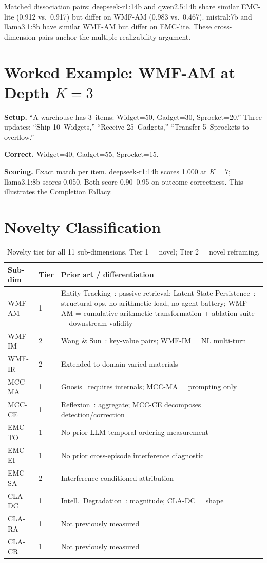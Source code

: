 \documentclass{article}
\begin{document}
Matched dissociation pairs: deepseek-r1:14b and qwen2.5:14b share
similar EMC-lite (0.912 vs.\ 0.917) but differ on WMF-AM (0.983 vs.\
0.467). mistral:7b and llama3.1:8b have similar WMF-AM but differ on
EMC-lite. These cross-dimension pairs anchor the multiple realizability
argument.

\section{Worked Example: WMF-AM at Depth $K{=}3$}
\label{app:worked}

\noindent\textbf{Setup.} ``A warehouse has 3~items: Widget=50,
Gadget=30, Sprocket=20.'' Three updates: ``Ship 10~Widgets,''
``Receive 25~Gadgets,'' ``Transfer 5~Sprockets to overflow.''

\noindent\textbf{Correct.} Widget=40, Gadget=55, Sprocket=15.

\noindent\textbf{Scoring.} Exact match per item. deepseek-r1:14b scores
1.000 at $K{=}7$; llama3.1:8b scores 0.050. Both score 0.90--0.95 on
outcome correctness. This illustrates the Completion Fallacy.

\section{Novelty Classification}
\label{app:novelty}

\begin{table}[h]
\centering
\small
\caption{Novelty tier for all 11 sub-dimensions. Tier 1 = novel;
Tier 2 = novel reframing.}
\label{tab:novelty}
\begin{tabular}{llp{6.5cm}}
\toprule
\textbf{Sub-dim} & \textbf{Tier} & \textbf{Prior art / differentiation} \\
\midrule
WMF-AM & 1 & Entity Tracking~\citep{entitytracking2023}: passive retrieval; Latent State Persistence~\citep{huang2025language}: structural ops, no arithmetic load, no agent battery; WMF-AM = cumulative arithmetic transformation + ablation suite + downstream validity \\
WMF-IM & 2 & Wang \& Sun~\citep{wang2025unableforgetproactiveinterference}: key-value pairs; WMF-IM = NL multi-turn \\
WMF-IR & 2 & Extended to domain-varied materials \\
MCC-MA & 1 & Gnosis~\citep{ghasemabadi2025can} requires internals; MCC-MA = prompting only \\
MCC-CE & 1 & Reflexion~\citep{shinn2023reflexion}: aggregate; MCC-CE decomposes detection/correction \\
EMC-TO & 1 & No prior LLM temporal ordering measurement \\
EMC-EI & 1 & No prior cross-episode interference diagnostic \\
EMC-SA & 2 & Interference-conditioned attribution \\
CLA-DC & 1 & Intell.\ Degradation~\citep{wang2026intelligence}: magnitude; CLA-DC = shape \\
CLA-RA & 1 & Not previously measured \\
CLA-CR & 1 & Not previously measured \\
\bottomrule
\end{tabular}
\end{table}
\end{document}
